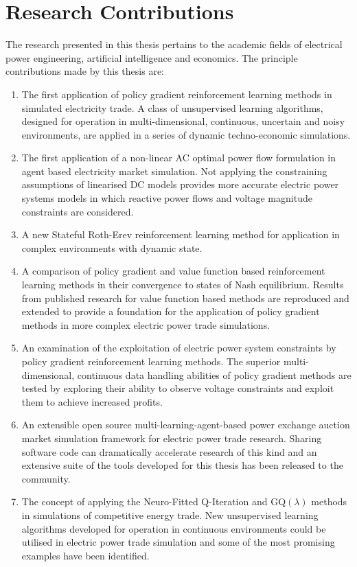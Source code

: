 \section{Research Contributions}
The research presented in this thesis pertains to the academic fields of
electrical power engineering, artificial intelligence and economics.  The
principle contributions made by this thesis are:
\begin{enumerate}
  \item The first application of policy gradient reinforcement learning
  methods in simulated electricity trade.  A class of unsupervised learning
  algorithms, designed for operation in multi-dimensional, continuous,
  uncertain and noisy environments, are applied in a series of dynamic
  techno-economic simulations.
  \item The first application of a non-linear AC optimal power flow formulation
  in agent based electricity market simulation.  Not applying the constraining
  assumptions of linearised DC models provides more accurate electric power
  systems models in which reactive power flows and voltage magnitude constraints
  are considered.
  \item A new Stateful Roth-Erev reinforcement learning method for application
  in complex environments with dynamic state.
  \item A comparison of policy gradient and value function based reinforcement
  learning methods in their convergence to states of Nash equilibrium. Results
  from published research for value function based methods are reproduced and
  extended to provide a foundation for the application of policy gradient
  methods in more complex electric power trade simulations.
  \item An examination of the exploitation of electric power system constraints
  by policy gradient reinforcement learning methods.  The
  superior multi-dimensional, continuous data handling abilities of policy
  gradient methods are tested by exploring their ability to observe voltage
  constraints and exploit them to achieve increased profits.
  \item An extensible open source multi-learning-agent-based
  power exchange auction market simulation framework for electric power trade
  research. Sharing software code can dramatically accelerate research of this
  kind and an extensive suite of the tools developed for this thesis has been
  released to the community.
  \item The concept of applying the Neuro-Fitted Q-Iteration and GQ$(\lambda)$
  methods in simulations of competitive energy trade. New unsupervised learning
  algorithms developed for operation in continuous environments could be
  utilised in electric power trade simulation and some of the most promising
  examples have been identified.
\end{enumerate}
